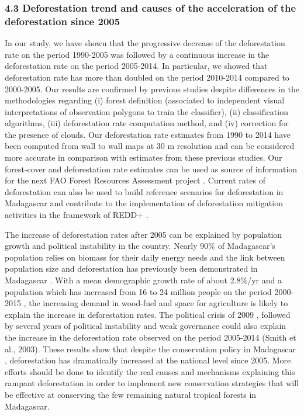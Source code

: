\documentclass[]{article}
\begin{document}
\hypertarget{deforestation-trend-and-causes-of-the-acceleration-of-the-deforestation-since-2005}{%
\subsubsection{4.3 Deforestation trend and causes of the acceleration of
the deforestation since
2005}\label{deforestation-trend-and-causes-of-the-acceleration-of-the-deforestation-since-2005}}

In our study, we have shown that the progressive decrease of the
deforestation rate on the period 1990-2005 was followed by a continuous
increase in the deforestation rate on the period 2005-2014. In
particular, we showed that deforestation rate has more than doubled on
the period 2010-2014 compared to 2000-2005. Our results are confirmed by
previous studies \citep{Harper2007, MEFT2009, ONE2015} despite
differences in the methodologies regarding (i) forest definition
(associated to independent visual interpretations of observation
polygons to train the classifier), (ii) classification algorithms, (iii)
deforestation rate computation method, and (iv) correction for the
presence of clouds. Our deforestation rate estimates from 1990 to 2014
have been computed from wall to wall maps at 30 m resolution and can be
considered more accurate in comparison with estimates from these
previous studies. Our forest-cover and deforestation rate estimates can
be used as source of information for the next FAO Forest Resources
Assessment project \citep{Keenan2015}. Current rates of deforestation
can also be used to build reference scenarios for deforestation in
Madagascar and contribute to the implementation of deforestation
mitigation activities in the framework of REDD+ \citep{Olander2008}.

The increase of deforestation rates after 2005 can be explained by
population growth and political instability in the country. Nearly 90\%
of Madagascar's population relies on biomass for their daily energy
needs \citep{Minten2013} and the link between population size and
deforestation has previously been demonstrated in Madagascar
\citep{Vieilledent2013, Gorenflo2011}. With a mean demographic growth
rate of about 2.8\%/yr and a population which has increased from 16 to
24 million people on the period 2000-2015 \citep{UN2015}, the increasing
demand in wood-fuel and space for agriculture is likely to explain the
increase in deforestation rates. The political crisis of 2009
\citep{Ploch2012}, followed by several years of political instability
and weak governance could also explain the increase in the deforestation
rate observed on the period 2005-2014 (Smith et al., 2003). These
results show that despite the conservation policy in Madagascar
\citep{Freudenberger2010}, deforestation has dramatically increased at
the national level since 2005. More efforts should be done to identify
the real causes and mechanisms explaining this rampant deforestation in
order to implement new conservation strategies that will be effective at
conserving the few remaining natural tropical forests in Madagascar.
\end{document}
